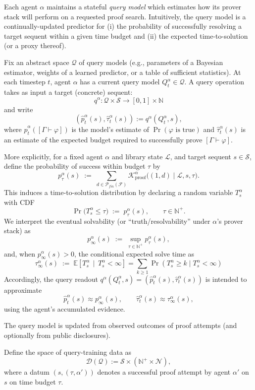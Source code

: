 \documentclass[letterpaper]{article} %
\renewcommand{\phi}{\varphi}
\newcommand{\proves}{\vdash}
\begin{document}
Each agent $\alpha$ maintains a stateful \emph{query model} which estimates how its prover stack will perform on a
requested proof search. Intuitively, the query model is a continually-updated predictor for
(i) the probability of successfully resolving a target sequent within a given time budget and
(ii) the expected time-to-solution (or a proxy thereof).


Fix an abstract space $\mathcal{Q}$ of query models (e.g., parameters of a Bayesian estimator, weights of a learned predictor, or a table of sufficient statistics). At each timestep $t$, agent $\alpha$ has a current query model $Q_t^\alpha \in \mathcal{Q}$.
A query operation takes as input a target (concrete) sequent:
\[
q^\alpha : \mathcal{Q}\times \mathcal{S} \to [0,1]\times \mathbb{N}
\]
and write
\[
(\hat p_t^\alpha(s),\hat \tau_t^\alpha(s))
:=
q^\alpha(Q_t^\alpha,s),
\]
where $\hat p_t^\alpha([\Gamma \proves \phi])$ is the model's estimate of $\Pr(\phi\text{ is true})$
and $\hat\tau_t^\alpha(s)$ is an estimate of the expected budget required to successfully prove $[\Gamma\proves \phi]$. 

More explicitly, for a fixed agent $\alpha$ and library state $\mathcal{L}$, and target sequent $s\in\mathcal{S}$, define the probability of success within budget $\tau$ by
\[
p^\alpha_\tau(s) \;:=\; \sum_{d\in\mathcal{P}_{fin}(\mathcal{F})}\mathcal{K}^{\alpha}_{\mathrm{proof}}\big((1,d)\mid \mathcal L, s,\tau\big).
\]
This induces a time-to-solution distribution by declaring a random variable $T^\alpha_s$ with CDF
\[
\Pr\!\big(T^\alpha_s \le \tau\big) \;:=\; p^\alpha_\tau(s), \qquad \tau\in\mathbb{N}^+.
\]
We interpret the eventual solvability (or ``truth/resolvability'' under $\alpha$'s prover stack) as
\[
p^\alpha_\infty(s) \;:=\; \sup_{\tau\in\mathbb{N}^+} p^\alpha_\tau(s),
\]
and, when $p^\alpha_\infty(s)>0$, the conditional expected solve time as
\[
\tau^\alpha_\infty(s) \;:=\; \mathbb{E}\!\left[T^\alpha_s \,\middle|\, T^\alpha_s < \infty\right]=\sum_{k\ge1}\Pr(T^\alpha_s\ge k \mid T^\alpha_s<\infty)
\]
Accordingly, the query readout $q^\alpha(Q^\alpha_t,s)=(\hat p^\alpha_t(s),\hat\tau^\alpha_t(s))$ is intended to approximate
\[
\hat p^\alpha_t(s)\approx p^\alpha_\infty(s),
\qquad
\hat\tau^\alpha_t(s)\approx \tau^\alpha_\infty(s),
\]
using the agent's accumulated evidence.



The query model is updated from observed outcomes of proof attempts (and optionally from public disclosures).

Define the space of query-training data as
\[
\mathcal{D}(\mathcal{Q}) := \mathcal{S} \times (\mathbb{N}^+ \times \mathcal{N}),
\]
where a datum $(s,(\tau, \alpha'))$ denotes a successful proof attempt by agent $\alpha'$ on $s$ on time budget $\tau$.
\end{document}

